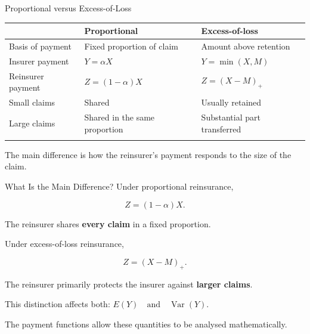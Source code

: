 \documentclass[
  ignorenonframetext,
  aspectratio=169,
]{beamer}
\newcounter{none} %
\begin{document}
\begin{frame}{Proportional versus Excess-of-Loss}
\protect{}\label{proportional-versus-excess-of-loss}
{\def\LTcaptype{none} %
\begin{longtable}[]{@{}
  >{\raggedright\arraybackslash}p{}
  >{\raggedright\arraybackslash}p{}
  >{\raggedright\arraybackslash}p{}@{}}
\toprule\noalign{}
\begin{minipage}[b]{\linewidth}\raggedright
\end{minipage} & \begin{minipage}[b]{\linewidth}\raggedright
Proportional
\end{minipage} & \begin{minipage}[b]{\linewidth}\raggedright
Excess-of-loss
\end{minipage} \\
\midrule\noalign{}
\endhead
Basis of payment & Fixed proportion of claim & Amount above retention \\
Insurer payment & \(Y=\alpha X\) & \(Y=\min(X,M)\) \\
Reinsurer payment & \(Z=(1-\alpha)X\) & \(Z=(X-M)_+\) \\
Small claims & Shared & Usually retained \\
Large claims & Shared in the same proportion & Substantial part
transferred \\
\bottomrule\noalign{}
\end{longtable}
}

The main difference is how the reinsurer's payment responds to the size
of the claim.
\end{frame}

\begin{frame}{What Is the Main Difference?}
\protect{}\label{what-is-the-main-difference}
Under proportional reinsurance,

\[
Z=(1-\alpha)X.
\]

The reinsurer shares \textbf{every claim} in a fixed proportion.

Under excess-of-loss reinsurance,

\[
Z=(X-M)_+.
\]

The reinsurer primarily protects the insurer against \textbf{larger
claims}.

This distinction affects both:
\(E(Y) \quad\text{and}\quad \operatorname{Var}(Y).\)

The payment functions allow these quantities to be analysed
mathematically.
\end{frame}
\end{document}
